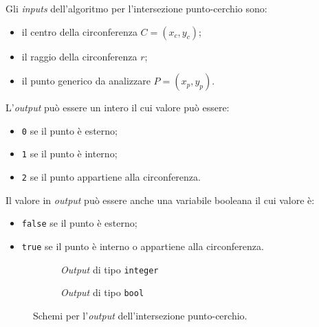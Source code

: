 \noindent
Gli \textit{inputs} dell'algoritmo per l'intersezione punto-cerchio sono:
\begin{itemize}
	\item il centro della circonferenza $C = (x_c, y_c)$;
	\item il raggio della circonferenza $r$;
	\item il punto generico da analizzare $P=(x_p, y_p)$.
\end{itemize}
L'\textit{output} può essere un intero il cui valore può essere:
\begin{itemize}
	\item \texttt{0} se il punto è esterno;
	\item \texttt{1} se il punto è interno;
	\item \texttt{2} se il punto appartiene alla circonferenza.
\end{itemize}
Il valore in \textit{output} può essere anche una variabile booleana il cui valore è:
\begin{itemize}
	\item \texttt{false} se il punto è esterno;
	\item \texttt{true} se il punto è interno o appartiene alla circonferenza.
\end{itemize}
%
\begin{figure}[h]
\hfill
	\begin{subfigure}{.45\textwidth}
	\centering
	\caption{\textit{Output} di tipo \texttt{integer}}
\end{subfigure}
\hfill
\begin{subfigure}{.45\textwidth}
	\centering
	\caption{\textit{Output} di tipo \texttt{bool}}
\end{subfigure}
\hfill
\caption{Schemi per l'\textit{output} dell'intersezione punto-cerchio.}
\end{figure}
